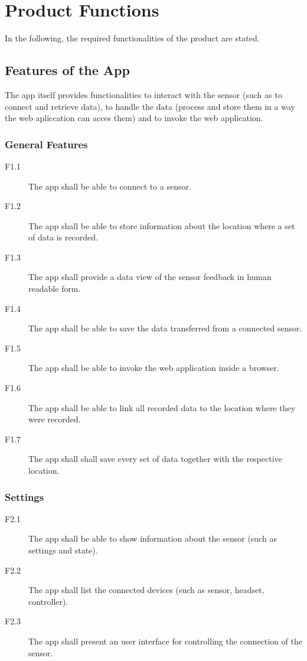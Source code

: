\section{Product Functions}

In the following, the required functionalities of the product are stated.

\subsection{Features of the App}

The app itself provides functionalities to interact with the sensor (such as to connect and retrieve data), to handle the data (process and store them in a way the web apliccation can acces them) and to invoke the web application.

\subsubsection{General Features}

\begin{description}
  \item[F1.1] The app shall be able to connect to a sensor.
  \item[F1.2] The app shall be able to store information about the location where a set of data is recorded.
  \item[F1.3] The app shall provide a data view of the sensor feedback in human readable form.
  \item[F1.4] The app shall be able to save the data transferred from a connected sensor.
  \item[F1.5] The app shall be able to invoke the web application inside a browser.
  \item[F1.6] The app shall be able to link all recorded data to the location where they were recorded.
  \item[F1.7] The app shall shall save every set of data together with the respective location.
\end{description}

\subsubsection{Settings}

\begin{description}
      \item[F2.1] The app shall be able to show information about the sensor (such as settings and state).
      \item[F2.2] The app shall list the connected devices (such as sensor, headset, controller). 
      \item[F2.3] The app shall present an user interface for controlling the connection of the sensor. 
    \end{description}

